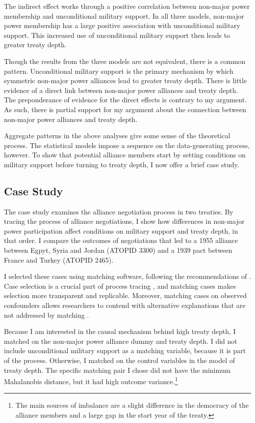 \documentclass[12pt]{article}
\begin{document}
The indirect effect works through a positive correlation between non-major power membership and unconditional military support. 
In all three models, non-major power membership has a large positive association with unconditional military support. 
This increased use of unconditional military support then leads to greater treaty depth. 


Though the results from the three models are not equivalent, there is a common pattern. 
Unconditional military support is the primary mechanism by which symmetric non-major power alliances lead to greater treaty depth. 
There is little evidence of a direct link between non-major power alliances and treaty depth. 
The preponderance of evidence for the direct effects is contrary to my argument. 
As such, there is partial support for my argument about the connection between non-major power alliances and treaty depth. 


Aggregate patterns in the above analyses give some sense of the theoretical process. 
The statistical models impose a sequence on the data-generating process, however. 
To show that potential alliance members start by setting conditions on military support before turning to treaty depth, I now offer a brief case study. 


\subsection{Case Study}


The case study examines the alliance negotiation process in two treaties. 
By tracing the process of alliance negotiations, I show how differences in non-major power participation affect conditions on military support and treaty depth, in that order. 
I compare the outcomes of negotiations that led to a 1955 alliance between Egpyt, Syria and Jordan (ATOPID 3300) and a 1939 pact between France and Turkey (ATOPID 2465). 


I selected these cases using matching software, following the recommendations of \citet{Nielsen2016}. 
Case selection is a crucial part of process tracing \citep{SeawrightGerring2008}, and matching cases makes selection more transparent and replicable. 
Moreover, matching cases on observed confounders allows researchers to contend with alternative explanations that are not addressed by matching \citep{Nielsen2016}. 


Because I am interested in the causal mechanism behind high treaty depth, I matched on the non-major power alliance dummy and treaty depth. 
I did not include unconditional military support as a matching variable, because it is part of the process. 
Otherwise, I matched on the control variables in the model of treaty depth. 
The specific matching pair I chose did not have the minimum Mahalanobis distance, but it had high outcome variance.\footnote{The main sources of imbalance are a slight difference in the democracy of the alliance members and a large gap in the start year of the treaty.} 
\end{document}
